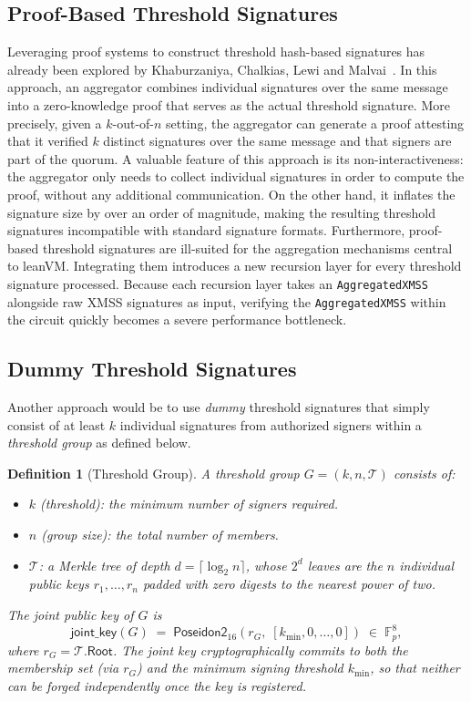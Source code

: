 \documentclass[11pt,a4paper]{article}
\newtheorem{definition}{Definition}[section]
\newcommand{\KB}{\mathbb{F}_{p}}  %
\newcommand{\aggsig}{\texttt{AggregatedXMSS}\xspace}
\newcommand{\XMSS}{\textsf{XMSS}\xspace}
\newcommand{\hypertree}{\mathcal{T}}
\newcommand{\poseidon}{\textsf{Poseidon2}\xspace}
\newcommand{\leanVM}{\textsf{leanVM}\xspace}
\begin{document}
\subsection{Proof-Based Threshold Signatures}
Leveraging proof systems to construct threshold hash-based signatures has already been explored by Khaburzaniya, Chalkias, Lewi and Malvai~\cite{agg-hash-based-starks}.
In this approach, an aggregator combines individual signatures over the same message into a zero-knowledge proof that serves as the actual threshold signature.
More precisely, given a $k$-out-of-$n$ setting, the aggregator can generate a proof attesting that it verified $k$ distinct signatures over the same message and that signers are part of the quorum.
A valuable feature of this approach is its non-interactiveness: the aggregator only needs to collect individual signatures in order to compute the proof, without any additional communication.
On the other hand, it inflates the signature size by over an order of magnitude, making the resulting threshold signatures incompatible with standard signature formats.
Furthermore, proof-based threshold signatures are ill-suited for the aggregation mechanisms central to \leanVM.
Integrating them introduces a new recursion layer for every threshold signature processed.
Because each recursion layer takes an \aggsig alongside raw \XMSS signatures as input, verifying the \aggsig within the circuit quickly becomes a severe performance bottleneck.

\subsection{Dummy Threshold Signatures}

Another approach would be to use \textit{dummy} threshold signatures that simply consist of at least $k$ individual signatures from authorized signers within a \textit{threshold group} as defined below.

\begin{definition}[Threshold Group]\label{def:thresh_group}
A threshold group $G = (k, n, \hypertree)$ consists of:
  \begin{itemize}
    \item $k$ (threshold): the minimum number of signers required.
    \item $n$ (group size): the total number of members.
    \item $\hypertree$: a Merkle tree of depth $d = \lceil \log_2 n \rceil$, whose $2^d$ leaves are the $n$ individual public keys $r_1, \ldots, r_n$ padded with zero digests to the nearest power of two.
  \end{itemize}
The joint public key of $G$ is
\[
  \mathsf{joint\_key}(G) \;=\; \poseidon_{16}\!\left(r_G,\; [k_{\min}, 0, \ldots, 0]\right) \;\in\; \KB^8,
\]
where $r_G = \hypertree.\mathsf{Root}$.  The joint key cryptographically commits to both the membership set (via $r_G$) and the minimum signing threshold $k_{\min}$, so that neither can be forged independently once the key is registered.
\end{definition}
\end{document}
